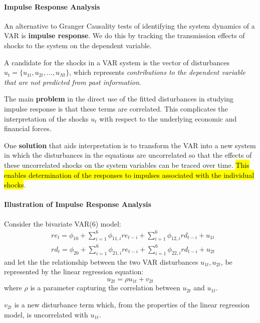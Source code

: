 \documentclass[11pt]{article}
\begin{document}
\paragraph{Impulse Response Analysis} \mbox{}

An alternative to Granger Causality tests of identifying the system dynamics of a VAR is \textbf{impulse response}. We do this by tracking the transmission effects of shocks to the system on the dependent variable.

A candidate for the shocks in a VAR system is the vector of disturbances $u_t = \{u_{1t}, u_{2t}, \ldots, u_{Nt}\}$, which represents \textit{contributions to the dependent variable that are not predicted from past information}.

The main \textbf{problem} in the direct use of the fitted disturbances in studying impulse response is that these terms are correlated. This complicates the interpretation of the shocks $u_t$ with respect to the underlying economic and financial forces.

One \textbf{solution} that aids interpretation is to transform the VAR into a new system in which the disturbances in the equations are uncorrelated so that the effects of these uncorrelated shocks on the system variables can be traced over time. \hl{This enables determination of the responses to impulses associated with the individual shocks}.

\paragraph{Illustration of Impulse Response Analysis} \mbox{}

Consider the bivariate VAR(6) model:
\begin{equation}
\label{Impulse illustration original}
\begin{aligned}
& r e_t=\phi_{10}+\sum_{i=1}^6 \phi_{11, i} r e_{t-i}+\sum_{i=1}^6 \phi_{12, i} r d_{t-i}+u_{1 t} \\
& r d_t=\phi_{20}+\sum_{i=1}^6 \phi_{21, i} r e_{t-i}+\sum_{i=1}^6 \phi_{22, i} r d_{t-i}+u_{2 t}
\end{aligned}
\end{equation}
and let the the relationship between the two VAR disturbances $u_{1t}, u_{2t}$, be represented by the linear regression equation:
\[u_{2t} = \rho u_{1t} + v_{2t}\]
where $\rho$ is a parameter capturing the correlation between $u_{2t}$ and $u_{1t}$.

\begin{note}
    $v_{2t}$ is a new disturbance term which, from the properties of the linear regression model, is uncorrelated with $u_{1t}$. 
\end{note}
\end{document}

